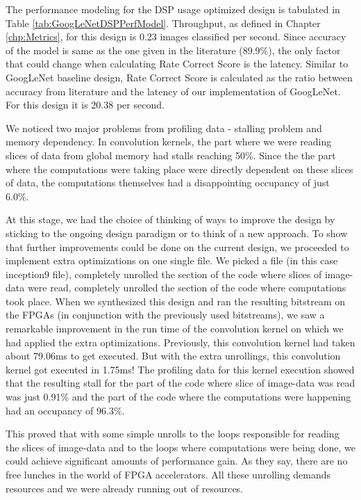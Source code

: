 The performance modeling for the DSP usage optimized design is tabulated in Table \ref{tab:GoogLeNetDSPPerfModel}. Throughput, as defined in Chapter \ref{chp:Metrics}, for this design is 0.23 images classified per second. Since accuracy of the model is same as the one given in the literature (89.9\%), the only factor that could change when calculating Rate Correct Score is the latency. Similar to GoogLeNet baseline design, Rate Correct Score is calculated as the ratio between accuracy from literature and the latency of our implementation of GoogLeNet. For this design it is 20.38 per second. 

We noticed two major problems from profiling data - stalling problem and memory dependency. In convolution kernels, the part where we were reading slices of data from global memory had stalls reaching 50\%. Since the  the part where the computations were taking place were directly dependent on these slices of data, the computations themselves had a disappointing occupancy of just 6.0\%. 

At this stage, we had the choice of thinking of ways to improve the design by sticking to the ongoing design paradigm or to think of a new approach. To show that further improvements could be done on the current design, we proceeded to implement extra optimizations on one single file. We picked a file (in this case inception9 file), completely unrolled the section of the code where slices of image-data were read, completely unrolled the section of the code where computations took place. When we synthesized this design and ran the resulting bitstream on the FPGAs (in conjunction with the previously used bitstreams), we saw a remarkable improvement in the run time of the convolution kernel on which we had applied the extra optimizations. Previously, this convolution kernel had taken about 79.06ms to get executed. But with the extra unrollings, this convolution kernel got executed in 1.75ms! The profiling data for this kernel execution showed that the resulting stall for the part of the code where slice of image-data was read was just 0.91\% and the part of the code where the computations were happening had an occupancy of 96.3\%.  

This proved that with some simple unrolls to the loops responsible for reading the slices of image-data and to the loops where computations were being done, we could achieve significant amounts of performance gain. As they say, there are no free lunches in the world of FPGA accelerators. All these unrolling demands resources and we were already running out of resources.


